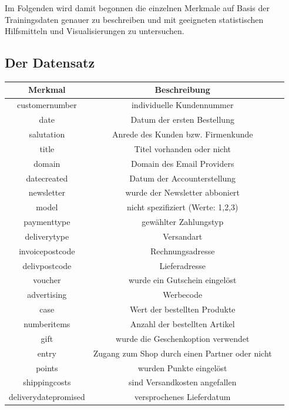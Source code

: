 Im Folgenden wird damit begonnen die einzelnen Merkmale auf Basis der Trainingsdaten genauer zu beschreiben und mit geeigneten statistischen Hilfsmitteln und Visualisierungen zu untersuchen.
\pagebreak
\begin{table}[]
\subsection{Der Datensatz}
\centering
\begin{tabular*}{\textwidth}{c @{\extracolsep{\fill}} cc}
\toprule
\textbf{Merkmal} & \textbf{Beschreibung} \\
\midrule
 customernumber & individuelle Kundennummer\\
 \hline
 date & Datum der ersten Bestellung\\
 \hline
 salutation & Anrede des Kunden bzw. Firmenkunde\\
 \hline
 title & Titel vorhanden oder nicht\\
 \hline
 domain & Domain des Email Providers\\
 \hline
 datecreated & Datum der Accounterstellung\\
 \hline
 newsletter & wurde der Newsletter abboniert\\
 \hline
 model & nicht spezifiziert (Werte: 1,2,3)\\
 \hline
 paymenttype & gewählter Zahlungstyp\\
 \hline
 deliverytype & Versandart\\
 \hline
 invoicepostcode & Rechnungsadresse\\
 \hline
 delivpostcode & Lieferadresse\\
 \hline
 voucher & wurde ein Gutschein eingelöst\\
 \hline
 advertising & Werbecode\\
 \hline
 case & Wert der bestellten Produkte\\
 \hline
 numberitems & Anzahl der bestellten Artikel\\
 \hline
 gift & wurde die Geschenkoption verwendet\\
 \hline
 entry & Zugang zum Shop durch einen Partner oder nicht\\
 \hline
 points & wurden Punkte eingelöst\\
 \hline
 shippingcosts & sind Versandkosten angefallen\\
 \hline
 deliverydatepromised & versprochenes Lieferdatum\\

\end{tabular*}
\end{table}
